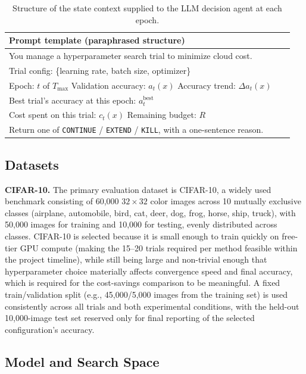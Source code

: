 \documentclass[11pt]{article}
\begin{document}
\begin{table}[h]
\centering
\small
\begin{tabular}{p{0.95\linewidth}}
\toprule
\textbf{Prompt template (paraphrased structure)} \\
\midrule
You manage a hyperparameter search trial to minimize cloud cost. \\
Trial config: \{learning rate, batch size, optimizer\} \\
Epoch: $t$ of $T_{\max}$ \quad Validation accuracy: $a_t(x)$ \quad Accuracy trend: $\Delta a_t(x)$ \\
Best trial's accuracy at this epoch: $a_t^{\text{best}}$ \\
Cost spent on this trial: $c_t(x)$ \quad Remaining budget: $R$ \\
Return one of \texttt{CONTINUE} / \texttt{EXTEND} / \texttt{KILL}, with a one-sentence reason. \\
\bottomrule
\end{tabular}
\caption{Structure of the state context supplied to the LLM decision agent at each epoch.}
\label{tab:prompt}
\end{table}

\subsection{Datasets}

\textbf{CIFAR-10.} The primary evaluation dataset is CIFAR-10, a widely used benchmark consisting of 60{,}000 $32\times32$ color images across 10 mutually exclusive classes (airplane, automobile, bird, cat, deer, dog, frog, horse, ship, truck), with 50{,}000 images for training and 10{,}000 for testing, evenly distributed across classes. CIFAR-10 is selected because it is small enough to train quickly on free-tier GPU compute (making the 15--20 trials required per method feasible within the project timeline), while still being large and non-trivial enough that hyperparameter choice materially affects convergence speed and final accuracy, which is required for the cost-savings comparison to be meaningful. A fixed train/validation split (e.g., 45{,}000/5{,}000 images from the training set) is used consistently across all trials and both experimental conditions, with the held-out 10{,}000-image test set reserved only for final reporting of the selected configuration's accuracy.

\subsection{Model and Search Space}
\end{document}
